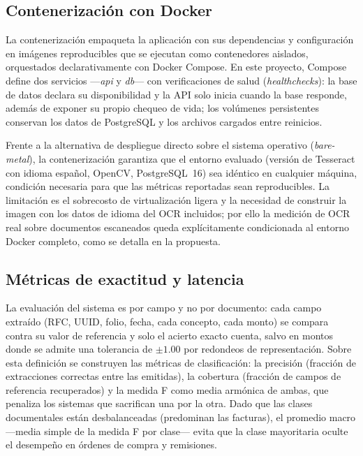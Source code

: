 \subsection{Contenerización con Docker} \label{sec:mt_docker}

La contenerización empaqueta la aplicación con sus dependencias y configuración en imágenes reproducibles que se ejecutan como contenedores aislados, orquestados declarativamente con Docker Compose\cite{docker_docs}. En este proyecto, Compose define dos servicios —\textit{api} y \textit{db}— con verificaciones de salud (\textit{healthchecks}): la base de datos declara su disponibilidad y la API solo inicia cuando la base responde, además de exponer su propio chequeo de vida; los volúmenes persistentes conservan los datos de PostgreSQL y los archivos cargados entre reinicios\cite{docker_docs}.

Frente a la alternativa de despliegue directo sobre el sistema operativo (\textit{bare-metal}), la contenerización garantiza que el entorno evaluado (versión de Tesseract con idioma español, OpenCV, PostgreSQL~16) sea idéntico en cualquier máquina, condición necesaria para que las métricas reportadas sean reproducibles\cite{docker_docs}. La limitación es el sobrecosto de virtualización ligera y la necesidad de construir la imagen con los datos de idioma del OCR incluidos; por ello la medición de OCR real sobre documentos escaneados queda explícitamente condicionada al entorno Docker completo, como se detalla en la propuesta\cite{docker_docs, tesseract_ocr}.

\subsection{Métricas de exactitud y latencia} \label{sec:mt_metricas}

La evaluación del sistema es por campo y no por documento: cada campo extraído (RFC, UUID, folio, fecha, cada concepto, cada monto) se compara contra su valor de referencia y solo el acierto exacto cuenta, salvo en montos donde se admite una tolerancia de $\pm 1.00$ por redondeos de representación\cite{sokolova_metrics_2009, structured_extraction_2023}. Sobre esta definición se construyen las métricas de clasificación: la precisión (fracción de extracciones correctas entre las emitidas), la cobertura (fracción de campos de referencia recuperados) y la medida F como media armónica de ambas, que penaliza los sistemas que sacrifican una por la otra\cite{sokolova_metrics_2009}. Dado que las clases documentales están desbalanceadas (predominan las facturas), el promedio macro —media simple de la medida F por clase— evita que la clase mayoritaria oculte el desempeño en órdenes de compra y remisiones\cite{sokolova_metrics_2009}.

